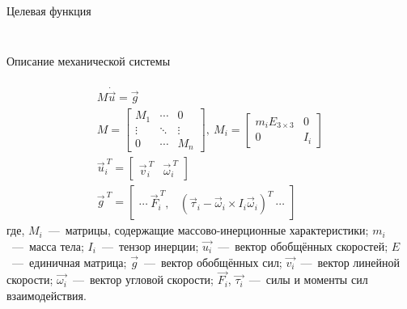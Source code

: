 \documentclass[aspectratio=169,xcolor=table,10pt]{beamer}
\begin{document}
\begin{frame}[t]{Целевая функция}
\begin{columns}[T,onlytextwidth]
\begin{column}{0.50\textwidth}
\begin{figure}[H]
            \end{figure}
        \end{column}
    \end{columns}
\end{frame}

\begin{frame}[t]{Описание механической системы}
    \framesubtitle{}
    \begin{align}
        M \dot{\vec{u}} = \vec{g}                                \\
        M = \begin{bmatrix}
                M_1    & \cdots & 0      \\
                \vdots & \ddots & \vdots \\
                0      & \cdots & M_n
            \end{bmatrix},\ M_i = \begin{bmatrix}
                                      m_i E_{3\times 3} & 0   \\
                                      0                 & I_i
                                  \end{bmatrix}        \\
        \vec{u}_i^{\ T} = \begin{bmatrix}
                              \vec{v}_i^{\ T} & \vec{\omega}_i^{\ T}
                          \end{bmatrix} \\
        \vec{g}^{\ T} = \begin{bmatrix}
                            \cdots \  \vec{F}_i^{\ T}, & (\vec{\tau}_i - \vec{\omega}_i \times I_i \vec{\omega}_i)^T\  \cdots
                        \end{bmatrix}
    \end{align}
    где, $M_i$~---~матрицы, содержащие массово-инерционные характеристики; $m_i$~---~масса тела; $I_i$~---~тензор инерции; $\vec{u_i}$~---~вектор обобщённых скоростей; $E$~---~единичная матрица; $\vec{g}$~---~вектор обобщённых сил; $\vec{v_i}$~---~вектор линейной скорости; $\vec{\omega_i}$~---~вектор угловой скорости; $\vec{F_i}$, $\vec{\tau_i}$~---~силы и моменты сил взаимодействия.
\end{frame}
\end{document}

